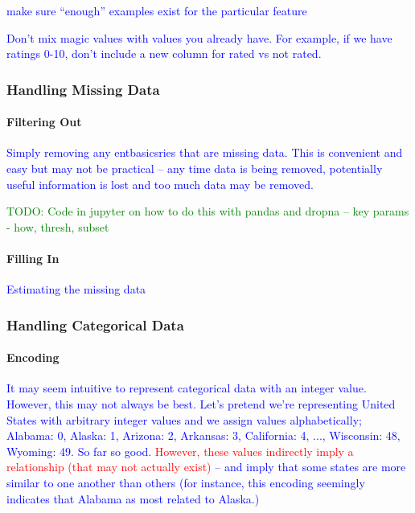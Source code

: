 
\textcolor{blue}{make sure ``enough'' examples exist for the particular feature}

\textcolor{blue}{Don't mix magic values with values you already have. For example, if we have ratings 0-10, don't include a new column for rated vs not rated.}

\subsubsection{Handling Missing Data}

\paragraph{Filtering Out}

\textcolor{blue}{Simply removing any entbasicsries that are missing data. This is convenient and easy but may not be practical -- any time data is being removed, potentially useful information is lost and too much data may be removed.}

\textcolor{green}{TODO: Code in jupyter on how to do this with pandas and dropna -- key params - how, thresh, subset}

\paragraph{Filling In}

\textcolor{blue}{Estimating the missing data}

\subsubsection{Handling Categorical Data}

\paragraph{Encoding}

\textcolor{blue}{It may seem intuitive to represent categorical data with an integer value. However, this may not always be best. Let's pretend we're representing United States with arbitrary integer values and we assign values alphabetically; Alabama: 0, Alaska: 1, Arizona: 2, Arkansas: 3, California: 4, ..., Wisconsin: 48, Wyoming: 49. So far so good. \textcolor{red}{However, these values indirectly imply a relationship (that may not actually exist)} -- and imply that some states are more similar to one another than others (for instance, this encoding seemingly indicates that Alabama as most related to Alaska.) }

